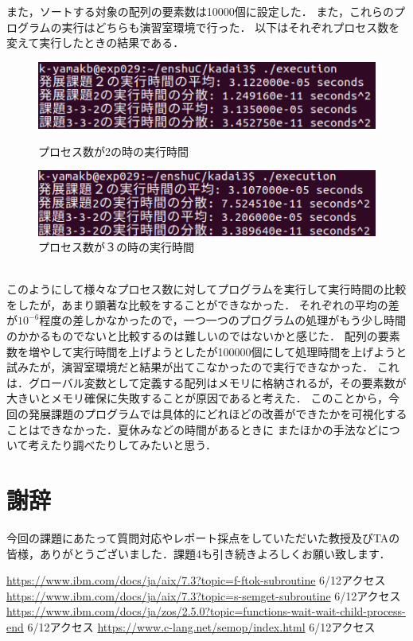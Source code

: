 \documentclass[dvipdfmx]{jarticle}
\begin{document}
また，ソートする対象の配列の要素数は10000個に設定した．
また，これらのプログラムの実行はどちらも演習室環境で行った．
以下はそれぞれプロセス数を変えて実行したときの結果である．
\begin{figure}[htbp]
    \begin{minipage}[b]{0.45\linewidth}
      \centering
      \includegraphics[keepaspectratio, scale=0.5]{resultproc2.png}
      \caption{プロセス数が2の時の実行時間}
    \end{minipage}
    \begin{minipage}[b]{0.45\linewidth}
      \centering
      \includegraphics[keepaspectratio, scale=0.5]{resultproc3.png}
      \caption{プロセス数が３の時の実行時間}
    \end{minipage}
  \end{figure}
\\このようにして様々なプロセス数に対してプログラムを実行して実行時間の比較をしたが，あまり顕著な比較をすることができなかった．
それぞれの平均の差が$10^{-6}$程度の差しかなかったので，一つ一つのプログラムの処理がもう少し時間のかかるものでないと比較するのは難しいのではないかと感じた．
配列の要素数を増やして実行時間を上げようとしたが100000個にして処理時間を上げようと試みたが，演習室環境だと結果が出てこなかったので実行できなかった．
これは．グローバル変数として定義する配列はメモリに格納されるが，その要素数が大きいとメモリ確保に失敗することが原因であると考えた．
このことから，今回の発展課題のプログラムでは具体的にどれほどの改善ができたかを可視化することはできなかった．夏休みなどの時間があるときに
またほかの手法などについて考えたり調べたりしてみたいと思う．
\section{謝辞}
今回の課題にあたって質問対応やレポート採点をしていただいた教授及びTAの皆様，ありがとうございました．課題4も引き続きよろしくお願い致します．
\begin{thebibliography}{99}
     \url{https://www.ibm.com/docs/ja/aix/7.3?topic=f-ftok-subroutine} 6/12アクセス
     \url{https://www.ibm.com/docs/ja/aix/7.3?topic=s-semget-subroutine} 6/12アクセス
     \url{https://www.ibm.com/docs/ja/zos/2.5.0?topic=functions-wait-wait-child-process-end} 6/12アクセス
     \url{https://www.c-lang.net/semop/index.html} 6/12アクセス
\end{thebibliography}
\end{document}
